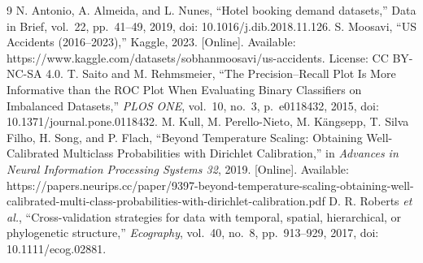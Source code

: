 \documentclass[conference]{IEEEtran}
\begin{document}
\begin{thebibliography}{9}
 N. Antonio, A. Almeida, and L. Nunes, ``Hotel booking demand datasets,'' Data in Brief, vol.~22, pp.~41--49, 2019, doi: 10.1016/j.dib.2018.11.126.
 S. Moosavi, ``US Accidents (2016--2023),'' Kaggle, 2023. [Online]. Available: https://www.kaggle.com/datasets/sobhanmoosavi/us-accidents. License: CC BY-NC-SA 4.0.
 T. Saito and M. Rehmsmeier, ``The Precision--Recall Plot Is More Informative than the ROC Plot When Evaluating Binary Classifiers on Imbalanced Datasets,'' \textit{PLOS ONE}, vol.~10, no.~3, p.~e0118432, 2015, doi: 10.1371/journal.pone.0118432.
 M. Kull, M. Perello-Nieto, M. K{\"a}ngsepp, T. Silva Filho, H. Song, and P. Flach, ``Beyond Temperature Scaling: Obtaining Well-Calibrated Multiclass Probabilities with Dirichlet Calibration,'' in \textit{Advances in Neural Information Processing Systems 32}, 2019. [Online]. Available: https://papers.neurips.cc/paper/9397-beyond-temperature-scaling-obtaining-well-calibrated-multi-class-probabilities-with-dirichlet-calibration.pdf
 D. R. Roberts \textit{et al.}, ``Cross-validation strategies for data with temporal, spatial, hierarchical, or phylogenetic structure,'' \textit{Ecography}, vol.~40, no.~8, pp.~913--929, 2017, doi: 10.1111/ecog.02881.
\end{thebibliography}
\end{document}
